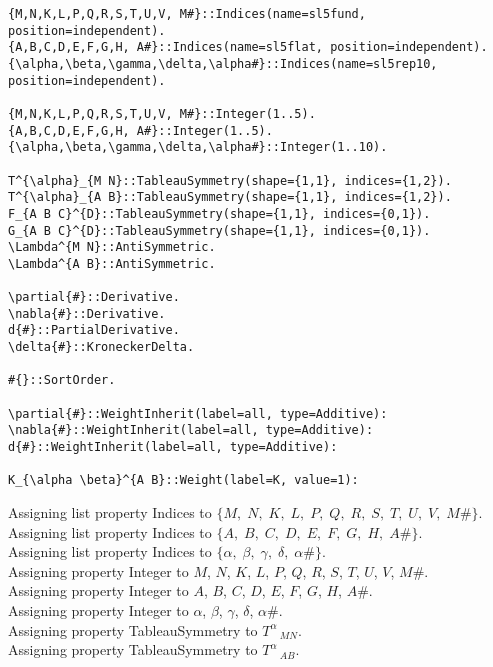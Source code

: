 \documentclass[11pt]{article}
\begin{document}
{\color[named]{Blue}\begin{verbatim}
{M,N,K,L,P,Q,R,S,T,U,V, M#}::Indices(name=sl5fund, position=independent).
{A,B,C,D,E,F,G,H, A#}::Indices(name=sl5flat, position=independent).
{\alpha,\beta,\gamma,\delta,\alpha#}::Indices(name=sl5rep10, position=independent).

{M,N,K,L,P,Q,R,S,T,U,V, M#}::Integer(1..5).
{A,B,C,D,E,F,G,H, A#}::Integer(1..5).
{\alpha,\beta,\gamma,\delta,\alpha#}::Integer(1..10).

T^{\alpha}_{M N}::TableauSymmetry(shape={1,1}, indices={1,2}).
T^{\alpha}_{A B}::TableauSymmetry(shape={1,1}, indices={1,2}).
F_{A B C}^{D}::TableauSymmetry(shape={1,1}, indices={0,1}).
G_{A B C}^{D}::TableauSymmetry(shape={1,1}, indices={0,1}).
\Lambda^{M N}::AntiSymmetric.
\Lambda^{A B}::AntiSymmetric.

\partial{#}::Derivative.
\nabla{#}::Derivative.
d{#}::PartialDerivative.
\delta{#}::KroneckerDelta.

#{}::SortOrder.

\partial{#}::WeightInherit(label=all, type=Additive):
\nabla{#}::WeightInherit(label=all, type=Additive):
d{#}::WeightInherit(label=all, type=Additive):

K_{\alpha \beta}^{A B}::Weight(label=K, value=1):
\end{verbatim}}
Assigning list property Indices to $\{M,\; N,\; K,\; L,\; P,\; Q,\; R,\; S,\; T,\; U,\; V,\; M\#\}$.
\\
Assigning list property Indices to $\{A,\; B,\; C,\; D,\; E,\; F,\; G,\; H,\; A\#\}$.
\\
Assigning list property Indices to $\{\alpha,\; \beta,\; \gamma,\; \delta,\; \alpha\#\}$.
\\
Assigning property Integer to $M$, $N$, $K$, $L$, $P$, $Q$, $R$, $S$, $T$, $U$, $V$, $M\#$.
\\
Assigning property Integer to $A$, $B$, $C$, $D$, $E$, $F$, $G$, $H$, $A\#$.
\\
Assigning property Integer to $\alpha$, $\beta$, $\gamma$, $\delta$, $\alpha\#$.
\\
Assigning property TableauSymmetry to ${T}^{\alpha}\,_{M N}$.
\\
Assigning property TableauSymmetry to ${T}^{\alpha}\,_{A B}$.
\end{document}
